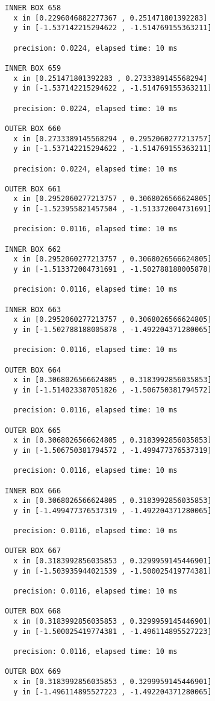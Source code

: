 \begin{verbatim}
INNER BOX 658
  x in [0.2296046882277367 , 0.251471801392283]
  y in [-1.537142215294622 , -1.514769155363211]

  precision: 0.0224, elapsed time: 10 ms

INNER BOX 659
  x in [0.251471801392283 , 0.2733389145568294]
  y in [-1.537142215294622 , -1.514769155363211]

  precision: 0.0224, elapsed time: 10 ms

OUTER BOX 660
  x in [0.2733389145568294 , 0.2952060277213757]
  y in [-1.537142215294622 , -1.514769155363211]

  precision: 0.0224, elapsed time: 10 ms

OUTER BOX 661
  x in [0.2952060277213757 , 0.3068026566624805]
  y in [-1.523955821457504 , -1.513372004731691]

  precision: 0.0116, elapsed time: 10 ms

INNER BOX 662
  x in [0.2952060277213757 , 0.3068026566624805]
  y in [-1.513372004731691 , -1.502788188005878]

  precision: 0.0116, elapsed time: 10 ms

INNER BOX 663
  x in [0.2952060277213757 , 0.3068026566624805]
  y in [-1.502788188005878 , -1.492204371280065]

  precision: 0.0116, elapsed time: 10 ms

OUTER BOX 664
  x in [0.3068026566624805 , 0.3183992856035853]
  y in [-1.514023387051826 , -1.506750381794572]

  precision: 0.0116, elapsed time: 10 ms

OUTER BOX 665
  x in [0.3068026566624805 , 0.3183992856035853]
  y in [-1.506750381794572 , -1.499477376537319]

  precision: 0.0116, elapsed time: 10 ms

INNER BOX 666
  x in [0.3068026566624805 , 0.3183992856035853]
  y in [-1.499477376537319 , -1.492204371280065]

  precision: 0.0116, elapsed time: 10 ms

OUTER BOX 667
  x in [0.3183992856035853 , 0.3299959145446901]
  y in [-1.503935944021539 , -1.500025419774381]

  precision: 0.0116, elapsed time: 10 ms

OUTER BOX 668
  x in [0.3183992856035853 , 0.3299959145446901]
  y in [-1.500025419774381 , -1.496114895527223]

  precision: 0.0116, elapsed time: 10 ms

OUTER BOX 669
  x in [0.3183992856035853 , 0.3299959145446901]
  y in [-1.496114895527223 , -1.492204371280065]


\end{verbatim}
